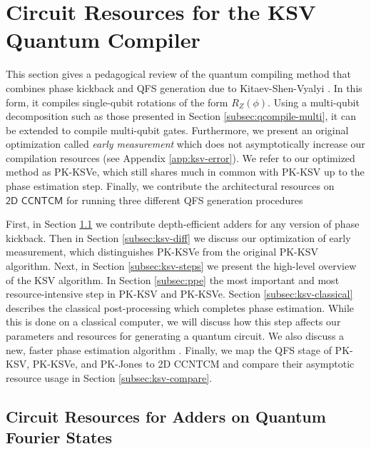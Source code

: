 \section{Circuit Resources for the KSV Quantum Compiler}
\label{sec:qcompile-ksv}

This section gives a pedagogical review of the quantum compiling method
that combines phase kickback and QFS generation due to
Kitaev-Shen-Vyalyi \cite{Kitaev2002}. In this form, it compiles single-qubit
rotations of the form $R_Z(\phi)$. Using a multi-qubit
decomposition such as those presented in Section \ref{subsec:qcompile-multi},
it can be extended to compile multi-qubit gates.
Furthermore, we present an
original optimization
called \emph{early measurement} which does not asymptotically increase
our compilation resources (see Appendix \ref{app:ksv-error}). We refer to
our optimized method as PK-KSVe, which still shares much in common with
PK-KSV up to the phase estimation step.
Finally, we contribute the architectural resources on $\textsf{2D CCNTCM}$ for running 
three different QFS generation procedures

First, in Section \ref{subsec:qfs-adder} we contribute depth-efficient
adders for any version of phase kickback.
Then in Section \ref{subsec:ksv-diff} we discuss our optimization of early
measurement, which distinguishes
PK-KSVe from the original PK-KSV algorithm.
Next,
in Section \ref{subsec:ksv-steps} we present the high-level overview
of the KSV algorithm. In Section \ref{subsec:ppe} the most important
and most resource-intensive step in PK-KSV and PK-KSVe.
Section \ref{subsec:ksv-classical} describes the classical post-processing
which completes phase estimation. While this is done on a classical computer,
we will discuss how this step affects our parameters and resources
for generating a quantum circuit. We also discuss a new, faster
phase estimation algorithm \cite{Svore2013}. Finally, we map the QFS
stage of PK-KSV,
PK-KSVe, and PK-Jones to \textsf{2D CCNTCM} and compare their
asymptotic resource usage in Section \ref{subsec:ksv-compare}.

\subsection{Circuit Resources for Adders on Quantum Fourier States}
\label{subsec:qfs-adder}

